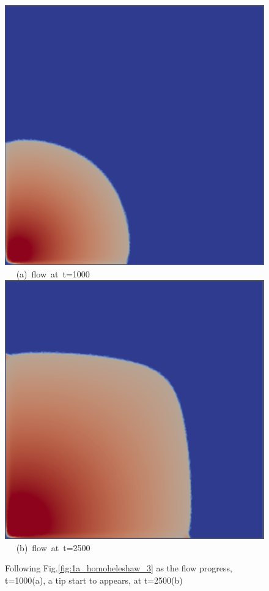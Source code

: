 \documentclass[preprint,authoryear,12pt]{elsarticle}
\begin{document}
\begin{figure}[h]
\vbox{
\hbox{\hspace{3.5cm}
\includegraphics[width=.5\textwidth]{./Pics1/Saffman_homogeneous_MR3/saffman_homo_fixed_1000.pdf} 
}
\vspace{0.0cm}
\hbox{\hspace{5.0cm} (a) flow at t=1000   
}
\vspace{0.25cm}
\hbox{\hspace{3.5cm}
\includegraphics[width=.5\textwidth]{./Pics1/Saffman_homogeneous_MR3/saffman_homo_fixed_2500.pdf}
}
\vspace{0.0cm}
\hbox{\hspace{5.0cm} (b) flow at t=2500  
}
}     
\caption{Following Fig.\ref{fig:1a_homoheleshaw_3} as the flow progress, t=1000(a), a tip start to appears, at t=2500(b)}
\label{fig:1b_homoheleshaw_3}
\end{figure}
\end{document}
